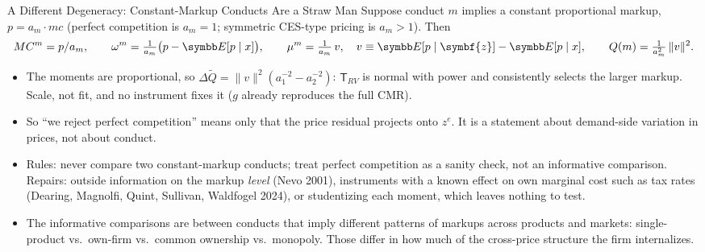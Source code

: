 \documentclass[aspectratio=169,10pt]{beamer}
\begin{document}
\begin{frame}{A Different Degeneracy: Constant-Markup Conducts Are a Straw Man}
\footnotesize
Suppose conduct $m$ implies a \alert{constant proportional markup}, $p = a_m \cdot mc$ (perfect competition is $a_m = 1$; symmetric CES-type pricing is $a_m > 1$). Then
\begin{align*}
MC^m = p/a_m, \qquad \omega^m = \tfrac{1}{a_m}\big(p - \E[p \mid x]\big), \qquad
\mu^m = \tfrac{1}{a_m}\, v, \quad v \equiv \E[p \mid \symbf{z}] - \E[p \mid x], \qquad
Q(m) = \tfrac{1}{a_m^2}\, \|v\|^2 .
\end{align*}
\begin{itemize}
\item The moments are \alert{proportional}, so $\Delta\widetilde Q = \|v\|^2 (a_1^{-2} - a_2^{-2})$: $\mathsf{T}_{RV}$ is normal with power and consistently selects the \alert{larger} markup. Scale, not fit, and no instrument fixes it ($g$ already reproduces the full CMR).
\item So ``we reject perfect competition'' means only that the price residual projects onto $z^e$. It is a statement about demand-side variation in prices, not about conduct.
\item Rules: never compare two constant-markup conducts; treat perfect competition as a sanity check, not an informative comparison. Repairs: outside information on the markup \emph{level} (Nevo 2001), instruments with a known effect on own marginal cost such as tax rates (Dearing, Magnolfi, Quint, Sullivan, Waldfogel 2024), or studentizing each moment, which leaves nothing to test.
\item The informative comparisons are between conducts that imply \alert{different patterns} of markups across products and markets: single-product vs.\ own-firm vs.\ common ownership vs.\ monopoly. Those differ in how much of the cross-price structure the firm internalizes.
\end{itemize}
\end{frame}
\end{document}
